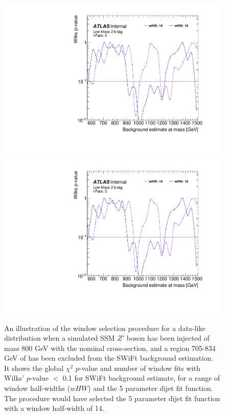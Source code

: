 \begin{figure}[!htb]
\captionsetup[subfigure]{aboveskip=0pt,justification=centering}
\centering
{} {
  \includegraphics[width=0.49\linewidth, angle=0,page=6]{figs/Dibjet/LowMass/FitStudy_min566/windowSel_corrFitCR_dataLike_v11_Zprimebb800_xsFactor1_removeWindow.pdf}
}\hspace{-8mm}
 {
  \includegraphics[width=0.49\linewidth, angle=0,page=8]{figs/Dibjet/LowMass/FitStudy_min566/windowSel_corrFitCR_dataLike_v11_Zprimebb800_xsFactor1_removeWindow.pdf}
}

\caption[ An illustration of the window selection procedure for a data-like distribution when
          a simulated SSM $Z'$ boson has been injected of mass 800 GeV with the nominal cross-section,
          and a region 705-834 GeV of has been excluded from the SWiFt background estimation.]
        {\label{fig:windowSel_Zprimebb800_xsFactor1}
          An illustration of the window selection procedure for a data-like distribution when
          a simulated SSM $Z'$ boson has been injected of mass 800 GeV with the nominal cross-section,
          and a region 705-834 GeV of has been excluded from the SWiFt background estimation.
          It shows the global $\chi^{2}$ \mbox{$p$-value} %
          and number of window fits with Wilks' \mbox{$p$-value} $<$ 0.1 for SWiFt background estimate,
          for a range of window half-widths ($wHW$) and the 5 parameter dijet fit function.
          The procedure would have selected the 5 parameter dijet fit function with a window half-width of 14.
}
\end{figure}

